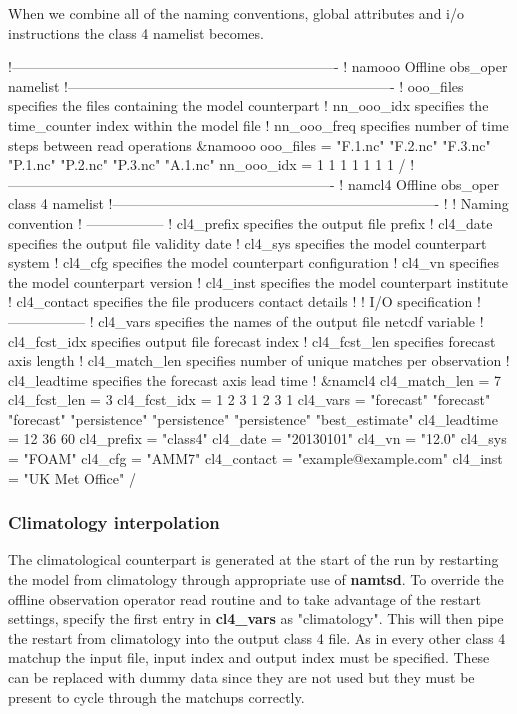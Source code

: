 \documentclass[../tex_main/NEMO_manual]{subfiles}
\begin{document}
When we combine all of the naming conventions, global attributes and i/o instructions the class 4 namelist becomes.

\begin{forlines}
!----------------------------------------------------------------------
!       namooo Offline obs_oper namelist
!----------------------------------------------------------------------
!   ooo_files    specifies the files containing the model counterpart
!   nn_ooo_idx   specifies the time_counter index within the model file
!   nn_ooo_freq  specifies number of time steps between read operations
&namooo
   ooo_files = "F.1.nc" "F.2.nc" "F.3.nc" "P.1.nc" "P.2.nc" "P.3.nc" "A.1.nc"
   nn_ooo_idx = 1 1 1 1 1 1 1
/
!----------------------------------------------------------------------
!       namcl4 Offline obs_oper class 4 namelist
!----------------------------------------------------------------------
!
!  Naming convention
!  -----------------
!  cl4_prefix    specifies the output file prefix
!  cl4_date      specifies the output file validity date
!  cl4_sys       specifies the model counterpart system
!  cl4_cfg       specifies the model counterpart configuration
!  cl4_vn        specifies the model counterpart version
!  cl4_inst      specifies the model counterpart institute
!  cl4_contact   specifies the file producers contact details
!
!  I/O specification
!  -----------------
!  cl4_vars      specifies the names of the output file netcdf variable
!  cl4_fcst_idx  specifies output file forecast index
!  cl4_fcst_len  specifies forecast axis length
!  cl4_match_len specifies number of unique matches per observation
!  cl4_leadtime  specifies the forecast axis lead time 
!
&namcl4
   cl4_match_len = 7
   cl4_fcst_len = 3
   cl4_fcst_idx = 1 2 3 1 2 3 1
   cl4_vars = "forecast" "forecast" "forecast" "persistence" "persistence"
              "persistence" "best_estimate"
   cl4_leadtime = 12 36 60
   cl4_prefix = "class4"
   cl4_date = "20130101"
   cl4_vn = "12.0"
   cl4_sys = "FOAM"
   cl4_cfg = "AMM7"
   cl4_contact = "example@example.com"
   cl4_inst = "UK Met Office"
/
\end{forlines}

\subsubsection{Climatology interpolation}

The climatological counterpart is generated at the start of the run by
restarting the model from climatology through appropriate use of \textbf{namtsd}.
To override the offline observation operator read routine and to take advantage of the restart settings,
specify the first entry in \textbf{cl4\_vars} as "climatology".
This will then pipe the restart from climatology into the output class 4 file.
As in every other class 4 matchup the input file, input index and output index must be specified.
These can be replaced with dummy data since they are not used but
they must be present to cycle through the matchups correctly. 
\end{document}
